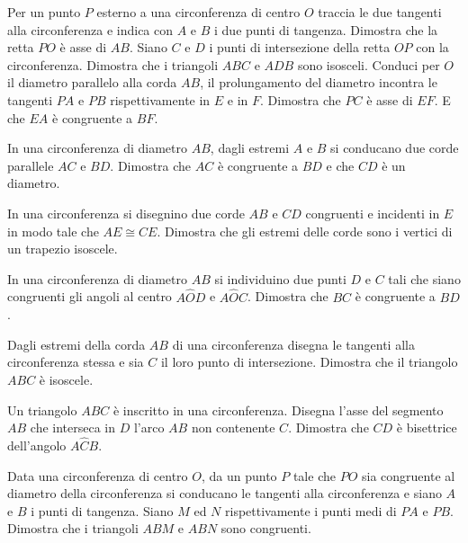 \begin{multicols}{2}
\begin{esercizio}
\label{ese:5.33}
Per un punto $P$ esterno a una circonferenza di centro $O$ traccia le 
due tangenti alla circonferenza e indica con $A$ e $B$ i due punti di 
tangenza. Dimostra che la retta $PO$ è asse di $AB$. Siano $C$ e $D$ 
i punti di intersezione della retta $OP$ con la circonferenza. 
Dimostra che i triangoli $ABC$ e $ADB$ sono isosceli. Conduci per $O$ 
il diametro parallelo alla corda $AB$, il prolungamento del diametro 
incontra le tangenti $PA$ e $PB$ rispettivamente in $E$ e in $F$. 
Dimostra che $PC$ è asse di $EF$. E che $EA$ è congruente a $BF$.
\end{esercizio}

\begin{esercizio}
\label{ese:5.34}
In una circonferenza di diametro $AB$, dagli estremi $A$ e $B$ si 
conducano due corde parallele $AC$ e $BD$. Dimostra che $AC$ è 
congruente a $BD$ e che $CD$ è un diametro.
\end{esercizio}

\begin{esercizio}
\label{ese:5.35}
In una circonferenza si disegnino due corde $AB$ e $CD$ congruenti e 
incidenti in $E$ in modo tale che $AE\cong CE$. Dimostra che gli 
estremi delle corde sono i vertici di un trapezio isoscele.
\end{esercizio}

\begin{esercizio}
\label{ese:5.36}
In una circonferenza di diametro $AB$ si individuino due punti $D$ e 
$C$ tali che siano congruenti gli angoli al centro $A\widehat{O}D$ e 
$A\widehat{O}C$. Dimostra che $BC$ è congruente a $BD$.
\end{esercizio}

\begin{esercizio}
\label{ese:5.37}
Dagli estremi della corda $AB$ di una circonferenza disegna le 
tangenti alla circonferenza stessa e sia $C$ il loro punto di 
intersezione. Dimostra che il triangolo $ABC$ è isoscele.
\end{esercizio}

\begin{esercizio}
\label{ese:5.38}
Un triangolo $ABC$ è inscritto in una circonferenza. Disegna l'asse 
del segmento $AB$ che interseca in $D$ l'arco $AB$ non contenente 
$C$. Dimostra che $CD$ è bisettrice dell'angolo $A\widehat{C}B$.
\end{esercizio}

\begin{esercizio}
\label{ese:5.39}
Data una circonferenza di centro $O$, da un punto $P$ tale che $PO$ 
sia congruente al diametro della circonferenza si conducano le 
tangenti alla circonferenza e siano $A$ e $B$ i punti di tangenza. 
Siano $M$ ed $N$ rispettivamente i punti medi di $PA$ e $PB$. 
Dimostra che i triangoli $ABM$ e $ABN$ sono congruenti.
\end{esercizio}


\end{multicols}

